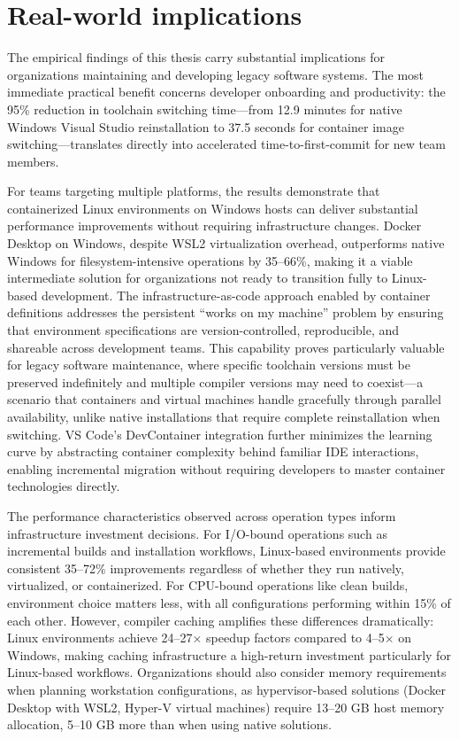 \section{Real-world implications}

The empirical findings of this thesis carry substantial implications for organizations maintaining and developing legacy software systems.
The most immediate practical benefit concerns developer onboarding and productivity: the 95\% reduction in toolchain switching time---from 12.9 minutes for native Windows Visual Studio reinstallation to 37.5 seconds for container image switching---translates directly into accelerated time-to-first-commit for new team members.

For teams targeting multiple platforms, the results demonstrate that containerized Linux environments on Windows hosts can deliver substantial performance improvements without requiring infrastructure changes.
Docker Desktop on Windows, despite WSL2 virtualization overhead, outperforms native Windows for filesystem-intensive operations by 35--66\%, making it a viable intermediate solution for organizations not ready to transition fully to Linux-based development.
The infrastructure-as-code approach enabled by container definitions addresses the persistent ``works on my machine'' problem by ensuring that environment specifications are version-controlled, reproducible, and shareable across development teams.
This capability proves particularly valuable for legacy software maintenance, where specific toolchain versions must be preserved indefinitely and multiple compiler versions may need to coexist---a scenario that containers and virtual machines handle gracefully through parallel availability, unlike native installations that require complete reinstallation when switching.
VS Code's DevContainer integration further minimizes the learning curve by abstracting container complexity behind familiar IDE interactions, enabling incremental migration without requiring developers to master container technologies directly.

The performance characteristics observed across operation types inform infrastructure investment decisions.
For I/O-bound operations such as incremental builds and installation workflows, Linux-based environments provide consistent 35--72\% improvements regardless of whether they run natively, virtualized, or containerized.
For CPU-bound operations like clean builds, environment choice matters less, with all configurations performing within 15\% of each other.
However, compiler caching amplifies these differences dramatically: Linux environments achieve 24--27$\times$ speedup factors compared to 4--5$\times$ on Windows, making caching infrastructure a high-return investment particularly for Linux-based workflows.
Organizations should also consider memory requirements when planning workstation configurations, as hypervisor-based solutions (Docker Desktop with WSL2, Hyper-V virtual machines) require 13--20 GB host memory allocation, 5--10 GB more than when using native solutions.

